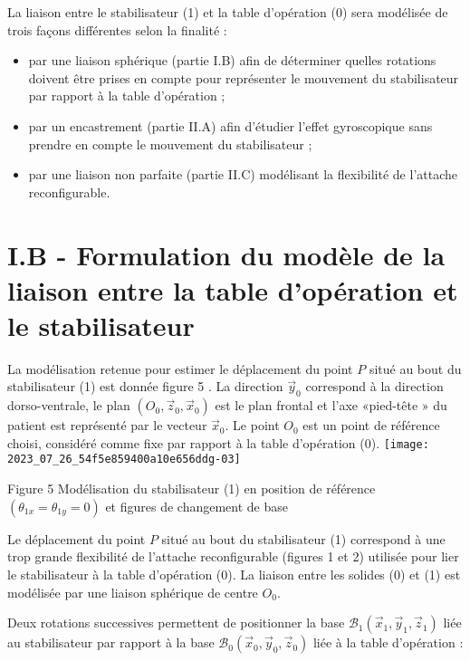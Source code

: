 La liaison entre le stabilisateur (1) et la table d'opération (0) sera modélisée de trois façons différentes selon la finalité :

\begin{itemize}
  \item par une liaison sphérique (partie I.B) afin de déterminer quelles rotations doivent être prises en compte pour représenter le mouvement du stabilisateur par rapport à la table d'opération ;

  \item par un encastrement (partie II.A) afin d'étudier l'effet gyroscopique sans prendre en compte le mouvement du stabilisateur ;

  \item par une liaison non parfaite (partie II.C) modélisant la flexibilité de l'attache reconfigurable.

\end{itemize}

\section{I.B - Formulation du modèle de la liaison entre la table d'opération et le stabilisateur}
La modélisation retenue pour estimer le déplacement du point $P$ situé au bout du stabilisateur (1) est donnée figure 5 . La direction $\vec{y}_{0}$ correspond à la direction dorso-ventrale, le plan $\left(O_{0}, \vec{z}_{0}, \vec{x}_{0}\right)$ est le plan frontal et l'axe «pied-tête » du patient est représenté par le vecteur $\vec{x}_{0}$. Le point $O_{0}$ est un point de référence choisi, considéré comme fixe par rapport à la table d'opération (0).
\texttt{[image: 2023\_07\_26\_54f5e859400a10e656ddg-03]}

Figure 5 Modélisation du stabilisateur (1) en position de référence $\left(\theta_{1 x}=\theta_{1 y}=0\right)$ et figures de changement de base

Le déplacement du point $P$ situé au bout du stabilisateur (1) correspond à une trop grande flexibilité de l'attache reconfigurable (figures 1 et 2) utilisée pour lier le stabilisateur à la table d'opération (0). La liaison entre les solides (0) et (1) est modélisée par une liaison sphérique de centre $O_{0}$.

Deux rotations successives permettent de positionner la base $\mathcal{B}_{1}\left(\vec{x}_{1}, \vec{y}_{1}, \vec{z}_{1}\right)$ liée au stabilisateur par rapport à la base $\mathcal{B}_{0}\left(\vec{x}_{0}, \vec{y}_{0}, \vec{z}_{0}\right)$ liée à la table d'opération :

